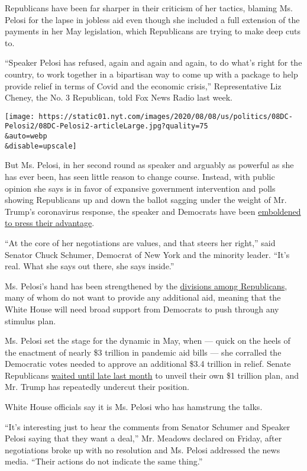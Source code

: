 Republicans have been far sharper in their criticism of her tactics,
blaming Ms. Pelosi for the lapse in jobless aid even though she included
a full extension of the payments in her May legislation, which
Republicans are trying to make deep cuts to.

``Speaker Pelosi has refused, again and again and again, to do what's
right for the country, to work together in a bipartisan way to come up
with a package to help provide relief in terms of Covid and the economic
crisis,'' Representative Liz Cheney, the No. 3 Republican, told Fox News
Radio last week.

\texttt{[image: https://static01.nyt.com/images/2020/08/08/us/politics/08DC-Pelosi2/08DC-Pelosi2-articleLarge.jpg?quality=75\\\&auto=webp\\\&disable=upscale]}

But Ms. Pelosi, in her second round as speaker and arguably as powerful
as she has ever been, has seen little reason to change course. Instead,
with public opinion she says is in favor of expansive government
intervention and polls showing Republicans up and down the ballot
sagging under the weight of Mr. Trump's coronavirus response, the
speaker and Democrats have been
\href{https://www.nytimes.com/2020/04/23/us/coronavirus-democrats-strategy.html}{emboldened
to press their advantage}.

``At the core of her negotiations are values, and that steers her
right,'' said Senator Chuck Schumer, Democrat of New York and the
minority leader. ``It's real. What she says out there, she says
inside.''

Ms. Pelosi's hand has been strengthened by the
\href{https://www.nytimes.com/2020/07/22/us/politics/coronavirus-stimulus.html}{divisions
among Republicans}, many of whom do not want to provide any additional
aid, meaning that the White House will need broad support from Democrats
to push through any stimulus plan.

Ms. Pelosi set the stage for the dynamic in May, when --- quick on the
heels of the enactment of nearly \$3 trillion in pandemic aid bills ---
she corralled the Democratic votes needed to approve an additional \$3.4
trillion in relief. Senate Republicans
\href{https://www.nytimes.com/2020/05/15/us/coronavirus-republicans-blowback-aid.html}{waited
until late last month} to unveil their own \$1 trillion plan, and Mr.
Trump has repeatedly undercut their position.

White House officials say it is Ms. Pelosi who has hamstrung the talks.

``It's interesting just to hear the comments from Senator Schumer and
Speaker Pelosi saying that they want a deal,'' Mr. Meadows declared on
Friday, after negotiations broke up with no resolution and Ms. Pelosi
addressed the news media. ``Their actions do not indicate the same
thing.''

